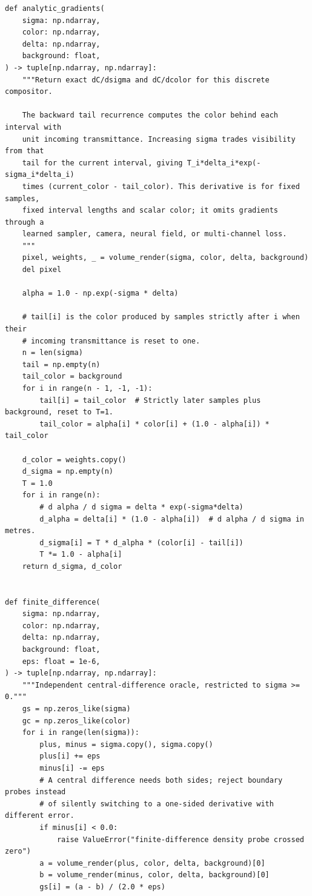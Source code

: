 \begin{verbatim}
def analytic_gradients(
    sigma: np.ndarray,
    color: np.ndarray,
    delta: np.ndarray,
    background: float,
) -> tuple[np.ndarray, np.ndarray]:
    """Return exact dC/dsigma and dC/dcolor for this discrete compositor.

    The backward tail recurrence computes the color behind each interval with
    unit incoming transmittance. Increasing sigma trades visibility from that
    tail for the current interval, giving T_i*delta_i*exp(-sigma_i*delta_i)
    times (current_color - tail_color). This derivative is for fixed samples,
    fixed interval lengths and scalar color; it omits gradients through a
    learned sampler, camera, neural field, or multi-channel loss.
    """
    pixel, weights, _ = volume_render(sigma, color, delta, background)
    del pixel

    alpha = 1.0 - np.exp(-sigma * delta)

    # tail[i] is the color produced by samples strictly after i when their
    # incoming transmittance is reset to one.
    n = len(sigma)
    tail = np.empty(n)
    tail_color = background
    for i in range(n - 1, -1, -1):
        tail[i] = tail_color  # Strictly later samples plus background, reset to T=1.
        tail_color = alpha[i] * color[i] + (1.0 - alpha[i]) * tail_color

    d_color = weights.copy()
    d_sigma = np.empty(n)
    T = 1.0
    for i in range(n):
        # d alpha / d sigma = delta * exp(-sigma*delta)
        d_alpha = delta[i] * (1.0 - alpha[i])  # d alpha / d sigma in metres.
        d_sigma[i] = T * d_alpha * (color[i] - tail[i])
        T *= 1.0 - alpha[i]
    return d_sigma, d_color


def finite_difference(
    sigma: np.ndarray,
    color: np.ndarray,
    delta: np.ndarray,
    background: float,
    eps: float = 1e-6,
) -> tuple[np.ndarray, np.ndarray]:
    """Independent central-difference oracle, restricted to sigma >= 0."""
    gs = np.zeros_like(sigma)
    gc = np.zeros_like(color)
    for i in range(len(sigma)):
        plus, minus = sigma.copy(), sigma.copy()
        plus[i] += eps
        minus[i] -= eps
        # A central difference needs both sides; reject boundary probes instead
        # of silently switching to a one-sided derivative with different error.
        if minus[i] < 0.0:
            raise ValueError("finite-difference density probe crossed zero")
        a = volume_render(plus, color, delta, background)[0]
        b = volume_render(minus, color, delta, background)[0]
        gs[i] = (a - b) / (2.0 * eps)


\end{verbatim}

